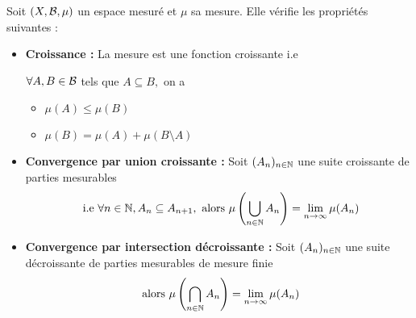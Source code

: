 \begin{prop}[Mesures]
    Soit $(X,\mathcal{B},\mu)$ un espace mesuré et $\mu$ sa mesure. Elle vérifie les propriétés suivantes :
    \begin{itemize}
        \item \textbf{Croissance :} La mesure est une fonction croissante i.e 

            \begin{minipage}{0.3\textwidth}
            \end{minipage}%
            \hfill
            \begin{minipage}{0.55\textwidth}  %
                $\forall A,B \in \mathcal{B}$ tels que  $A \subseteq B,$ on a  
                \begin{itemize}
                    \item  $\mu(A) \leq \mu (B)$
                    \item $\mu(B) = \mu(A) + \mu (B \setminus A)$
                \end{itemize}
            \end{minipage}

        \item \textbf{Convergence par union croissante :} Soit $(A_n)_{n\in\mathbb{N}}$ une suite croissante de parties mesurables
            \[ \text{ i.e } \forall n \in \mathbb{N}, A_n \subseteq A_{n+1}, \text{ alors } \mu \left( \bigcup_{n\in\mathbb{N}} A_n \right) = \lim_{n\to\infty} \mu(A_n) \] 
        \item \textbf{Convergence par intersection décroissante :} Soit $(A_n)_{n\in\mathbb{N}}$ une suite décroissante de parties mesurables de mesure finie
            \[ \text{ alors } \mu \left( \bigcap_{n\in\mathbb{N}} A_n \right) = \lim_{n\to\infty} \mu (A_n) \] 
    \end{itemize}
\end{prop}

